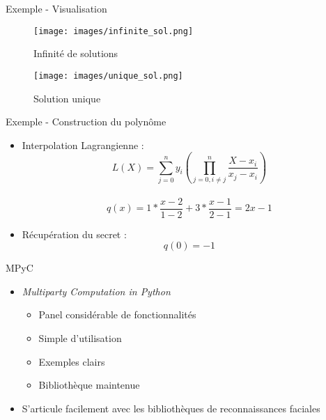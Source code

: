 \documentclass[9pt]{beamer}
\begin{document}
\begin{frame}{Exemple - Visualisation}
    \begin{figure}[ht]
        \begin{minipage}[b]{0.45\linewidth}
            \centering
            \texttt{[image: images/infinite\_sol.png]}
            \caption{Infinité de solutions}
            \label{fig:infinite-sol}
        \end{minipage}
        \hspace{0.5cm}
        \pause
        \begin{minipage}[b]{0.45\linewidth}
            \centering
            \texttt{[image: images/unique\_sol.png]}
            \caption{Solution unique}
            \label{fig:b}
        \end{minipage}
    \end{figure}
\end{frame}

\begin{frame}{Exemple - Construction du polynôme}
    \begin{itemize}
        \item <1-> Interpolation Lagrangienne :\\
        \[ L(X)=\sum_{j=0}^{n}y_i(\prod_{j=0,i\neq j}^n \frac{X - x_i}{x_j - x_i}) \]\\
        \[ q(x) = 1 * \frac{x-2}{1-2} + 3 * \frac{x - 1}{2 - 1} =  2x - 1\]
        \item <2-> Récupération du secret :\\
        \[ q(0) = -1 \]
    \end{itemize}
\end{frame}

\begin{frame}{MPyC}
    \begin{itemize}[<+- | alert@+>]
        \item \textit{Multiparty Computation in Python}
        \begin{itemize}
            \item Panel considérable de fonctionnalités
            \item Simple d'utilisation 
            \item Exemples clairs
            \item Bibliothèque maintenue
        \end{itemize}
        \item S'articule facilement avec les bibliothèques de reconnaissances faciales
    \end{itemize}
\end{frame}
\end{document}
